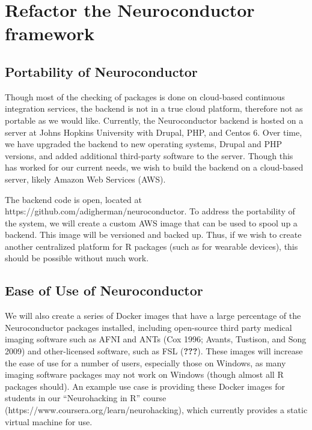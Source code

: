 \documentclass[]{elsarticle} %
\begin{document}
\hypertarget{refactor-the-neuroconductor-framework}{%
\section{Refactor the Neuroconductor framework}\label{refactor-the-neuroconductor-framework}}

\hypertarget{portability-of-neuroconductor}{%
\subsection{Portability of Neuroconductor}\label{portability-of-neuroconductor}}

Though most of the checking of packages is done on cloud-based continuous integration services, the backend is not in a true cloud platform, therefore not as portable as we would like. Currently, the Neuroconductor backend is hosted on a server at Johns Hopkins University with Drupal, PHP, and Centos 6. Over time, we have upgraded the backend to new operating systems, Drupal and PHP versions, and added additional third-party software to the server. Though this has worked for our current needs, we wish to build the backend on a cloud-based server, likely Amazon Web Services (AWS).

The backend code is open, located at https://github.com/adigherman/neuroconductor. To address the portability of the system, we will create a custom AWS image that can be used to spool up a backend. This image will be versioned and backed up. Thus, if we wish to create another centralized platform for R packages (such as for wearable devices), this should be possible without much work.

\hypertarget{ease-of-use-of-neuroconductor}{%
\subsection{Ease of Use of Neuroconductor}\label{ease-of-use-of-neuroconductor}}

We will also create a series of Docker images that have a large percentage of the Neuroconductor packages installed, including open-source third party medical imaging software such as AFNI and ANTs (Cox 1996; Avants, Tustison, and Song 2009) and other-licensed software, such as FSL ({\textbf{???}}). These images will increase the ease of use for a number of users, especially those on Windows, as many imaging software packages may not work on Windows (though almost all R packages should). An example use case is providing these Docker images for students in our ``Neurohacking in R'' course (https://www.coursera.org/learn/neurohacking), which currently provides a static virtual machine for use.
\end{document}
